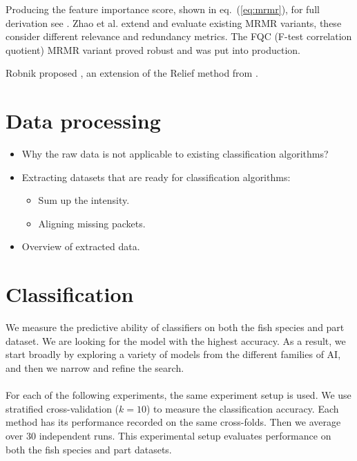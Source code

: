 \documentclass[runningheads]{llncs}
\begin{document}
Producing the feature importance score, shown in eq.~(\ref{eq:mrmr}), for full derivation see \cite{liu1995chi2,zhao2019maximum}.
Zhao et al. \cite{zhao2019maximum} extend and evaluate existing MRMR variants, these consider different relevance and redundancy metrics.
The FQC (F-test correlation quotient) MRMR variant proved robust and was put into production. 

Robnik proposed \cite{kononenko1994estimating}, an extension of the Relief method from \cite{kira1992practical}.

\section{Data processing}


\begin{itemize}
  \item Why the raw data is not applicable to existing classification algorithms?
  \item Extracting datasets that are ready for classification algorithms:
        \begin{itemize}
          \item Sum up the intensity.
          \item Aligning missing packets.
        \end{itemize}
  \item Overview of extracted data.
\end{itemize}

\section{Classification}

We measure the predictive ability of classifiers on both the fish species and part dataset.
We are looking for the model with the highest accuracy.
As a result, we start broadly by exploring a variety of models from the different families of AI, and then we narrow and refine the search.
\\\\
For each of the following experiments, the same experiment setup is used.
We use stratified cross-validation ($k=10$) to measure the classification accuracy.
Each method has its performance recorded on the same cross-folds.
Then we average over 30 independent runs.
This experimental setup evaluates performance on both the fish species and part datasets.
\end{document}
